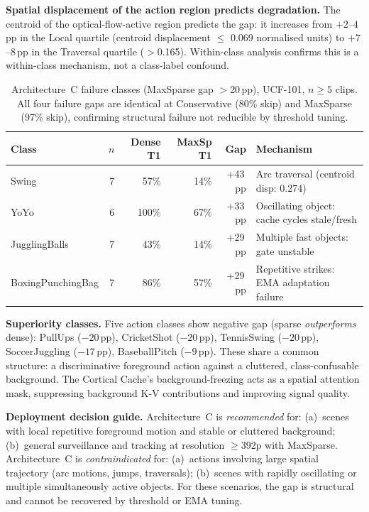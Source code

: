 \documentclass{article}
\begin{document}
\textbf{Spatial displacement of the action region predicts degradation.}
The centroid of the optical-flow-active region predicts the gap: it
increases from $+2$--$4$\,pp in the Local quartile (centroid displacement
$\leq$ 0.069 normalised units) to $+7$--$8$\,pp in the Traversal
quartile ($>$0.165). Within-class analysis confirms this is a within-class
mechanism, not a class-label confound.

\begin{table}[htbp]
\centering
\setlength{\tabcolsep}{4pt}
\renewcommand{\arraystretch}{1.12}
\begin{tabular}{lrrrrl}
\toprule
\textbf{Class} & $n$ & \textbf{Dense T1}
  & \textbf{MaxSp T1} & \textbf{Gap} & \textbf{Mechanism} \\
\midrule
Swing             & 7 & 57\%  & 14\% & +43\,pp & Arc traversal (centroid disp: 0.274) \\
YoYo              & 6 & 100\% & 67\% & +33\,pp & Oscillating object: cache cycles stale/fresh \\
JugglingBalls     & 7 & 43\%  & 14\% & +29\,pp & Multiple fast objects: gate unstable \\
BoxingPunchingBag & 7 & 86\%  & 57\% & +29\,pp & Repetitive strikes: EMA adaptation failure \\
\bottomrule
\end{tabular}
\caption{Architecture~C failure classes (MaxSparse gap $>$20\,pp), UCF-101,
$n \geq 5$ clips. All four failure gaps are identical at Conservative (80\%
skip) and MaxSparse (97\% skip), confirming structural failure not reducible
by threshold tuning.}
\label{tab:failure-classes}
\end{table}

\textbf{Superiority classes.}
Five action classes show negative gap (sparse \emph{outperforms} dense):
PullUps ($-20$\,pp), CricketShot ($-20$\,pp), TennisSwing ($-20$\,pp),
SoccerJuggling ($-17$\,pp), BaseballPitch ($-9$\,pp). These share a
common structure: a discriminative foreground action against a cluttered,
class-confusable background. The Cortical Cache's background-freezing
acts as a spatial attention mask, suppressing background K-V contributions
and improving signal quality.

\textbf{Deployment decision guide.}
Architecture~C is \emph{recommended} for: (a)~scenes with local
repetitive foreground motion and stable or cluttered background;
(b)~general surveillance and tracking at resolution $\geq$392p with
MaxSparse.
Architecture~C is \emph{contraindicated} for: (a)~actions involving
large spatial trajectory (arc motions, jumps, traversals); (b)~scenes
with rapidly oscillating or multiple simultaneously active objects.
For these scenarios, the gap is structural and cannot be recovered by
threshold or EMA tuning.
\end{document}
